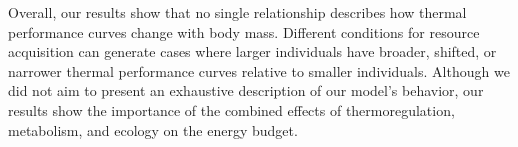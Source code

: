 Overall, our results show that no single relationship describes how thermal performance curves change with body mass.
Different conditions for resource acquisition can generate cases where larger individuals have broader, shifted, or narrower thermal performance curves relative to smaller individuals.
Although we did not aim to present an exhaustive description of our model's behavior, our results show the importance of the combined effects of thermoregulation, metabolism, and ecology on the energy budget.
